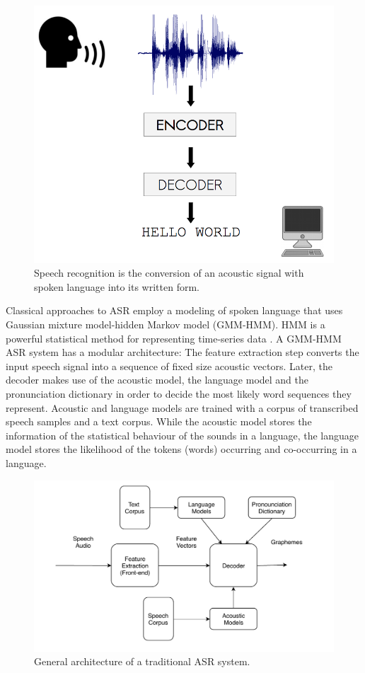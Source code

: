 \begin{figure}[t]
  \centering
  \includegraphics[width=0.7\linewidth]{img/asr_schema.png}
  \caption{Speech recognition is the conversion of an acoustic signal with spoken language into its written form. }
  \label{sota:asr_process}
\end{figure}

Classical approaches to ASR employ a modeling of spoken language that uses Gaussian mixture model-hidden Markov model (GMM-HMM). HMM is a powerful statistical method for representing time-series data \citep{slp_book, hmm_balls}. A GMM-HMM ASR system has a modular architecture: The feature extraction step converts the input speech signal into a sequence of fixed size acoustic vectors. Later, the decoder makes use of the acoustic model, the language model and the pronunciation dictionary in order to decide the most likely word sequences they represent. Acoustic and language models are trained with a corpus of transcribed speech samples and a text corpus. While the acoustic model stores the information of the statistical behaviour of the sounds in a language, the language model stores the likelihood of the tokens (words) occurring and co-occurring in a language. 

\begin{figure}[t]
  \centering
  \includegraphics[width=0.8\linewidth]{img/asr2.pdf}
  \caption{General architecture of a traditional ASR system.}
  \label{sota:asr_schema}
\end{figure}

